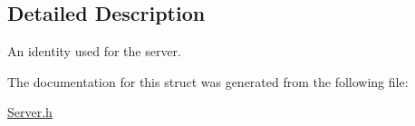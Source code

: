 \subsection{Detailed Description}
An identity used for the server. 

The documentation for this struct was generated from the following file\-:\begin{DoxyCompactItemize}
\item 
\hyperlink{a00125}{Server.\-h}\end{DoxyCompactItemize}
